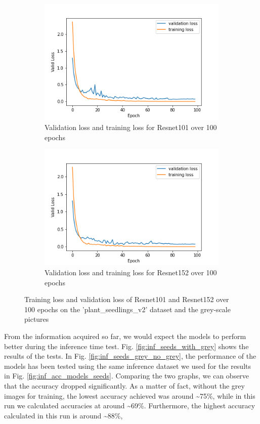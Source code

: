      
\begin{figure}[h]
\begin{subfigure}{0.5\textwidth}
     \centering
	    \includegraphics[width = \gws cm]{epoch_valid_loss_resnet101_2.png}
\caption{Validation loss and training loss for Resnet101 over 100 epochs}\label{fig:epoch_valid_loss_resnet101_2}
     \end{subfigure}
\begin{subfigure}{0.5\textwidth}
     \centering
	    \includegraphics[width = \gws cm]{epoch_valid_loss_resnet152_2.png}
\caption{Validation loss and training loss for Resnet152 over 100 epochs}\label{fig:epoch_valid_loss_resnet152_2}
     \end{subfigure}  
     \caption{Training loss and validation loss of Resnet101 and Resnet152 over 100 epochs on the  'plant\_seedlings\_v2' dataset and the grey-scale pictures}
        \label{fig:tran_valid_loss_seeds_res_100_2}
\end{figure}
From the information acquired so far, we would expect the models to perform better during the inference time test. Fig. \ref{fig:inf_seeds_with_grey} shows the results of the tests. In Fig. \ref{fig:inf_seeds_grey_no_grey}, the performance of the models has been tested using the same inference dataset we used for the results in Fig. \ref{fig:inf_acc_models_seeds}. Comparing the two graphs, we can observe that the accuracy dropped significantly. As a matter of fact, without the grey images for training, the lowest accuracy achieved was around \textasciitilde75\%, while in this run we calculated accuracies at around \textasciitilde69\%. Furthermore, the highest accuracy calculated in this run is around \textasciitilde88\%,
